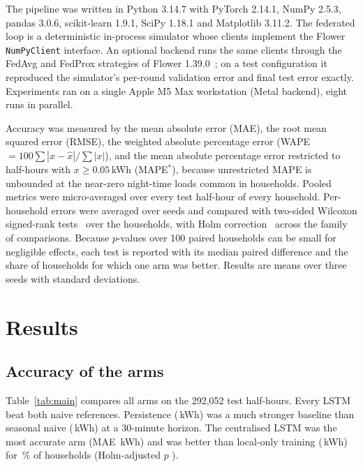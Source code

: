 The pipeline was written in Python 3.14.7 with PyTorch 2.14.1, NumPy 2.5.3, pandas 3.0.6, scikit-learn 1.9.1, SciPy
1.18.1 and Matplotlib 3.11.2. The federated loop is a deterministic in-process simulator whose clients implement the
Flower \texttt{NumPyClient} interface. An optional backend runs the same clients through the FedAvg and FedProx
strategies of Flower 1.39.0~\cite{beutel2020flower}; on a test configuration it reproduced the simulator's per-round
validation error and final test error exactly. Experiments ran on a single Apple M5 Max workstation (Metal backend),
eight runs in parallel.

Accuracy was measured by the mean absolute error (MAE), the root mean squared error (RMSE), the weighted absolute
percentage error (WAPE $=100\sum|x-\hat{x}|/\sum|x|$), and the mean absolute percentage error restricted to half-hours
with $x\ge0.05$\,kWh (MAPE$^\ast$), because unrestricted MAPE is unbounded at the near-zero night-time loads common in
households. Pooled metrics were micro-averaged over every test half-hour of every household. Per-household errors were
averaged over seeds and compared with two-sided Wilcoxon signed-rank tests~\cite{wilcoxon1945} over the
\NumHouseholds{} households, with Holm correction~\cite{holm1979} across the family of comparisons. Because $p$-values
over 100 paired households can be small for negligible effects, each test is reported with its median paired
difference and the share of households for which one arm was better. Results are means over three seeds with standard
deviations.

\section{Results}

\subsection{Accuracy of the arms}
Table~\ref{tab:main} compares all arms on the 292{,}052 test half-hours. Every LSTM beat both naive references.
Persistence (\PersistenceMAE{}\,kWh) was a much stronger baseline than seasonal naive (\SeasonalNaiveMAE{}\,kWh) at a
30-minute horizon. The centralised LSTM was the most accurate arm (MAE \EtwocentralizedMAE{}\,kWh) and was better than
local-only training (\EonelocalMAE{}\,kWh) for \StEtwocentralizedvsEonelocalBetter{}\,\% of households (Holm-adjusted
$p$ \StEtwocentralizedvsEonelocalP{}).

\begin{table}
\caption{Test error of all arms (kWh per half-hour; mean $\pm$ s.d. over three seeds). MAPE$^\ast$ is computed over
half-hours with load of at least 0.05\,kWh. Traffic is the cumulative upload plus download over all rounds; for the
centralised arm it is the raw training-data volume.}\label{tab:main}

\end{table}

